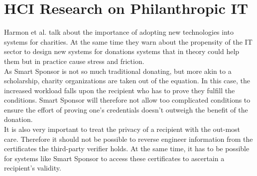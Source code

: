 \section*{HCI Research on Philanthropic IT}
Harmon et al.\cite{philit} talk about the importance of adopting new technologies into systems for charities. At the same time they warn about the propensity of the IT sector to design new systems for donations systems that in theory could help them but in practice cause stress and friction.\\
As Smart Sponsor is not so much traditional donating, but more akin to a scholarship, charity organizations are taken out of the equation. In this case, the increased workload falls upon the recipient who has to prove they fulfill the conditions. Smart Sponsor will therefore not allow too complicated conditions to ensure the effort of proving one's credentials doesn't outweigh the benefit of the donation.\\
It is also very important to treat the privacy of a recipient with the out-most care. Therefore it should not be possible to reverse engineer information from the certificates the third-party verifier holds. At the same time, it has to be possible for systems like Smart Sponsor to access these certificates to ascertain a recipient's validity.
